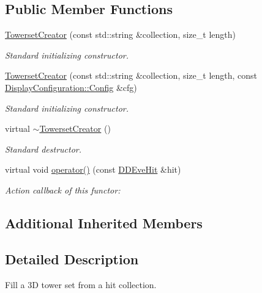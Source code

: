 \subsection*{Public Member Functions}
\begin{DoxyCompactItemize}
\item 
\hyperlink{struct_d_d4hep_1_1_towerset_creator_ad29dbe8a2d87c04776af0852f614ee13}{Towerset\+Creator} (const std\+::string \&collection, size\+\_\+t length)
\begin{DoxyCompactList}\small\item\em Standard initializing constructor. \end{DoxyCompactList}\item 
\hyperlink{struct_d_d4hep_1_1_towerset_creator_a7e565ec3d9642bf0a3f778e730d1b9aa}{Towerset\+Creator} (const std\+::string \&collection, size\+\_\+t length, const \hyperlink{class_d_d4hep_1_1_display_configuration_1_1_config}{Display\+Configuration\+::\+Config} \&cfg)
\begin{DoxyCompactList}\small\item\em Standard initializing constructor. \end{DoxyCompactList}\item 
virtual \hyperlink{struct_d_d4hep_1_1_towerset_creator_ae74914cad72d7fdd2b78f97cd74b7b90}{$\sim$\+Towerset\+Creator} ()
\begin{DoxyCompactList}\small\item\em Standard destructor. \end{DoxyCompactList}\item 
virtual void \hyperlink{struct_d_d4hep_1_1_towerset_creator_a5afb1ff94fd502e36e56df19effe7221}{operator()} (const \hyperlink{class_d_d4hep_1_1_d_d_eve_hit}{D\+D\+Eve\+Hit} \&hit)
\begin{DoxyCompactList}\small\item\em Action callback of this functor\+: \end{DoxyCompactList}\end{DoxyCompactItemize}
\subsection*{Additional Inherited Members}


\subsection{Detailed Description}
Fill a 3D tower set from a hit collection. 

